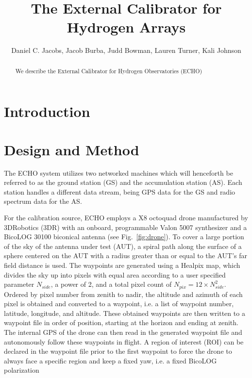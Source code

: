 \documentclass[preprint2]{aastex}
\begin{document}
\title{The External Calibrator for Hydrogen Arrays}
\author{
Daniel C. Jacobs,
Jacob Burba,
Judd Bowman,
Lauren Turner,
Kali Johnson}

\setcounter{footnote}{1}


\begin{abstract}
We describe the External Calibrator for Hydrogen Observatories (ECHO)
\end{abstract}



\section{Introduction}\label{sec:intro}

\section{Design and Method}

The ECHO system utilizes two networked machines which will henceforth be referred to as the ground station (GS) and the accumulation station (AS).  Each station handles a different data stream, being GPS data for the GS and radio spectrum data for the AS.  %

For the calibration source, ECHO employs a X8 octoquad drone manufactured by 3DRobotics (3DR) with an onboard, programmable Valon 5007 synthesizer and a BicoLOG 30100 biconical antenna (see Fig.~\ref{fig:drone}).  To cover a large portion of the sky of the antenna under test (AUT), a spiral path along the surface of a sphere centered on the AUT with a radius greater than or equal to the AUT's far field distance is used.  The waypoints are generated using a Healpix map, which divides the sky up into pixels with equal area according to a user specified parameter $N_{side}$, a power of 2, and a total pixel count of $N_{pix}=12\times N_{side}^2$.  Ordered by pixel number from zenith to nadir, the altitude and azimuth of each pixel is obtained and converted to a waypoint, i.e. a list of waypoint number, latitude, longitude, and altitude.  These obtained waypoints are then written to a waypoint file in order of position, starting at the horizon and ending at zenith.  The internal GPS of the drone can then read in the generated waypoint file and autonomously follow these waypoints in flight.  A region of interest (ROI) can be declared in the waypoint file prior to the first waypoint to force the drone to always face a specific region and keep a fixed yaw, i.e. a fixed BicoLOG polarization
\end{document}
